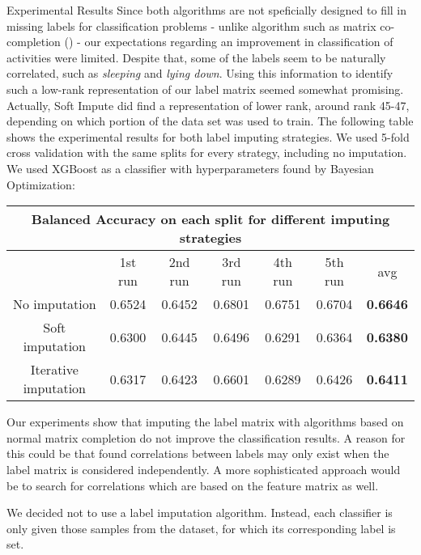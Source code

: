 \begin{subsection}{Experimental Results}
	Since both algorithms are not speficially designed to fill in missing labels for classification problems - unlike algorithm such as matrix co-completion (\cite{Xu18}) - our expectations regarding an improvement in classification of activities were limited. Despite that, some of the labels seem to be naturally correlated, such as \emph{sleeping} and \emph{lying down}. Using this information to identify such a low-rank representation of our label matrix seemed somewhat promising. Actually, Soft Impute did find a representation of lower rank, around rank 45-47, depending on which portion of the data set was used to train. The following table shows the experimental results for both label imputing strategies. We used 5-fold cross validation with the same splits for every strategy, including no imputation. We used XGBoost as a classifier with hyperparameters found by Bayesian Optimization:
	
	\begin{center}
		\begin{tabular}{ |c||c|c|c|c|c|c|  }
			\hline
			\multicolumn{7}{|c|}{Balanced Accuracy on each split for different imputing strategies} \\
			\hline
			& 1st run &2nd run &3rd run& 4th run & 5th run & avg\\
			\hline
			No imputation&0.6524&0.6452&0.6801&0.6751&0.6704&\textbf{0.6646}\\

			Soft imputation&0.6300&0.6445&0.6496&0.6291&0.6364&\textbf{0.6380}\\
			Iterative imputation&0.6317&0.6423&0.6601&0.6289&0.6426&\textbf{0.6411}\\
			\hline
		\end{tabular}
	\end{center}
	Our experiments show that imputing the label matrix with algorithms based on normal matrix completion do not improve the classification results. A reason for this could be that found correlations between labels may only exist when the label matrix is considered independently. A more sophisticated approach would be to search for correlations which are based on the feature matrix as well. \par
	We decided not to use a label imputation algorithm. Instead, each classifier is only given those samples from the dataset, for which its corresponding label is set.
\end{subsection}